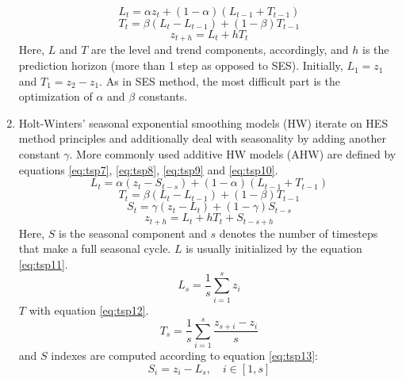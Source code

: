 \documentclass[3p,times,procedia]{elsarticle}
\begin{document}
\begin{enumerate}
\begin{equation} \label{eq:tsp4}
L_t = \alpha z_t + (1-\alpha) (L_{t-1} + T_{t-1})
\end{equation}
\begin{equation} \label{eq:tsp5}
T_t = \beta (L_t - L_{t-1}) + (1-\beta) T_{t-1}
\end{equation}
\begin{equation} \label{eq:tsp6}
z_{t+h} = L_t + hT_t
\end{equation}
Here, $L$ and $T$ are the level and trend components, accordingly, and $h$ is the prediction horizon (more than 1 step as opposed to SES). Initially, $L_1 = z_1$ and $T_1 = z_2 - z_1$. As in SES method, the most difficult part is the optimization of $\alpha$ and $\beta$ constants.
\item Holt-Winters' seasonal exponential smoothing models (HW) iterate on HES method principles and additionally deal with seasonality by adding another constant $\gamma$. More commonly used additive HW models (AHW) are defined by equations \ref{eq:tsp7}, \ref{eq:tsp8}, \ref{eq:tsp9} and \ref{eq:tsp10}.
\begin{equation} \label{eq:tsp7}
L_t = \alpha (z_t - S_{t-s}) + (1-\alpha) (L_{t-1} + T_{t-1})
\end{equation}
\begin{equation} \label{eq:tsp8}
T_t = \beta (L_t - L_{t-1}) + (1-\beta) T_{t-1}
\end{equation}
\begin{equation} \label{eq:tsp9}
S_t = \gamma (z_t - L_t) + (1-\gamma) S_{t-s}
\end{equation}
\begin{equation} \label{eq:tsp10}
z_{t+h} = L_t + hT_t + S_{t-s+h}
\end{equation}
Here, $S$ is the seasonal component and $s$ denotes the number of timesteps that make a full seasonal cycle. $L$ is usually initialized by the equation \ref{eq:tsp11}.
\begin{equation} \label{eq:tsp11}
L_s = \frac{1}{s} \sum_{i=1}^s z_i
\end{equation}
$T$ with equation \ref{eq:tsp12}.
\begin{equation} \label{eq:tsp12}
T_s = \frac{1}{s} \sum_{i=1}^s \frac{z_{s+i} - z_i}{s}
\end{equation}
and $S$ indexes are computed according to equation \ref{eq:tsp13}:
\begin{equation} \label{eq:tsp13}
S_i = z_i - L_s, \quad i \in [1,s]
\end{equation}

\end{enumerate}
\end{document}
